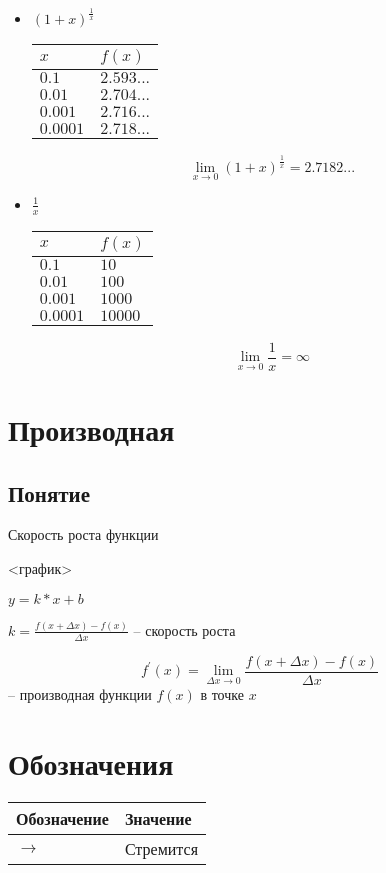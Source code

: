 \documentclass{article}
\begin{document}
\begin{itemize}
	\item $(1 + x)^\frac{1}{x}$

		\begin{tabular}{ | l | l | }
			\hline
			$x$ & $f(x)$ \\ \hline
			$0.1$ & $2.593...$ \\
			$0.01$ & $2.704...$ \\
			$0.001$ & $2.716...$ \\
			$0.0001$ & $2.718...$ \\
			\hline
		\end{tabular}

		$$\lim_{x \to 0} (1 + x)^\frac{1}{x} = 2.7182...$$

	\item  $\frac{1}{x}$

		\begin{tabular}{ | l | l | }
			\hline
			$x$ & $f(x)$ \\ \hline
			$0.1$ & $10$ \\
			$0.01$ & $100$ \\
			$0.001$ & $1000$ \\
			$0.0001$ & $10000$ \\
			\hline
		\end{tabular}

		$$\lim_{x \to 0} \frac{1}{x} = \infty$$

\end{itemize}


\section{Производная}
\label{section:derivative}
\subsection{Понятие}
Скорость роста функции

<график>

$y = k*x + b$

$k = \frac{f(x + \Delta x) - f(x)}{\Delta x}$ -- скорость роста

$$f^\prime(x) = \lim_{\Delta x \to 0} \frac{f(x + \Delta x) - f(x)}{\Delta x}$$ -- производная функции $f(x)$ в точке $x$





\section{Обозначения}
\begin{tabular}{ | l | l | }
	\hline
	Обозначение & Значение \\ \hline
	$\to$ & Стремится \\
	\hline
\end{tabular}





\end{document}
